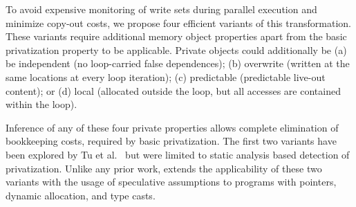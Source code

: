 To avoid expensive monitoring of write sets during parallel execution
and minimize copy-out costs, we propose four efficient variants of
this transformation.
%
These variants require additional memory object properties apart from the basic
privatization property to be applicable.  Private
objects could additionally be (a) be independent (no loop-carried false
dependences); (b) overwrite (written at the same locations at every
loop iteration); (c) predictable (predictable live-out content);
or (d) local (allocated outside the loop, but all accesses are
contained within the loop).

Inference of any of these four private properties allows complete
elimination of bookkeeping costs, required by basic privatization.
The first two variants have been explored by Tu et
al.~\cite{tu:94:lcpc} but were limited to static analysis based
detection of privatization. Unlike any prior work, \name extends
the applicability of these two variants with the usage of speculative
assumptions to programs with pointers, dynamic allocation, and type
casts.





\lstset{basicstyle=\ttfamily, numbers=left, numberstyle=\tiny,
  stepnumber=1, numbersep=5pt}

